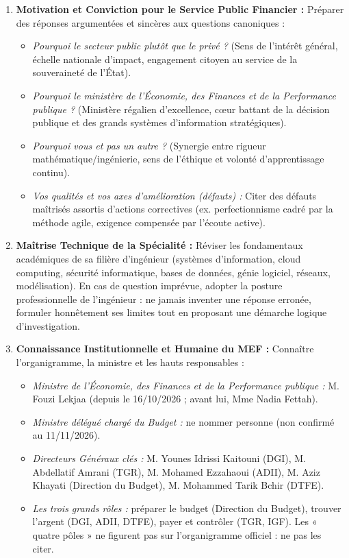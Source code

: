 \begin{tcolorbox}[colback=blue!5!white,colframe=chaporange,title=\textbf{La Feuille de Route des 11 Piliers de l'Épreuve Orale (Approche Top-Down)}]
\begin{enumerate}[label=\textbf{\arabic*.}]
    \item \textbf{Motivation et Conviction pour le Service Public Financier :}
    Préparer des réponses argumentées et sincères aux questions canoniques :
    \begin{itemize}
        \item \textit{Pourquoi le secteur public plutôt que le privé ?} (Sens de l'intérêt général, échelle nationale d'impact, engagement citoyen au service de la souveraineté de l'État).
        \item \textit{Pourquoi le ministère de l'Économie, des Finances et de la Performance publique ?} (Ministère régalien d'excellence, cœur battant de la décision publique et des grands systèmes d'information stratégiques).
        \item \textit{Pourquoi vous et pas un autre ?} (Synergie entre rigueur mathématique/ingénierie, sens de l'éthique et volonté d'apprentissage continu).
        \item \textit{Vos qualités et vos axes d'amélioration (défauts) :} Citer des défauts maîtrisés assortis d'actions correctives (ex. perfectionnisme cadré par la méthode agile, exigence compensée par l'écoute active).
    \end{itemize}

    \item \textbf{Maîtrise Technique de la Spécialité :}
    Réviser les fondamentaux académiques de sa filière d'ingénieur (systèmes d'information, cloud computing, sécurité informatique, bases de données, génie logiciel, réseaux, modélisation). En cas de question imprévue, adopter la posture professionnelle de l'ingénieur : ne jamais inventer une réponse erronée, formuler honnêtement ses limites tout en proposant une démarche logique d'investigation.

    \item \textbf{Connaissance Institutionnelle et Humaine du MEF :}
    Connaître l'organigramme, la ministre et les hauts responsables :
    \begin{itemize}
        \item \textit{Ministre de l'Économie, des Finances et de la Performance publique :} M. Fouzi Lekjaa (depuis le 16/10/2026 ; avant lui, Mme Nadia Fettah).
        \item \textit{Ministre délégué chargé du Budget :} ne nommer personne (non confirmé au 11/11/2026).
        \item \textit{Directeurs Généraux clés :} M. Younes Idrissi Kaitouni (DGI), M. Abdellatif Amrani (TGR), M. Mohamed Ezzahaoui (ADII), M. Aziz Khayati (Direction du Budget), M. Mohammed Tarik Bchir (DTFE).
        \item \textit{Les trois grands rôles :} préparer le budget (Direction du Budget), trouver l'argent (DGI, ADII, DTFE), payer et contrôler (TGR, IGF). Les « quatre pôles » ne figurent pas sur l'organigramme officiel : ne pas les citer.
    \end{itemize}


\end{enumerate}
\end{tcolorbox}
